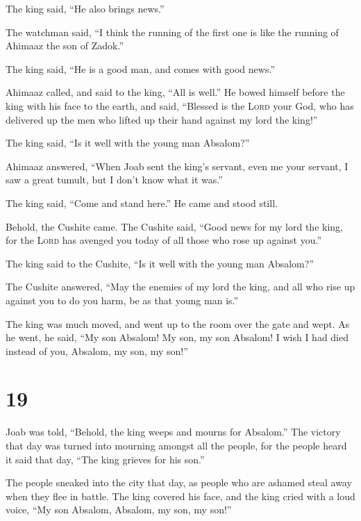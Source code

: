 The king said, ``He also brings news.''

 The watchman said, ``I think the running of the first
one is like the running of Ahimaaz the son of Zadok.''

The king said, ``He is a good man, and comes with good news.''

 Ahimaaz called, and said to the king, ``All is well.''
He bowed himself before the king with his face to the earth, and said,
``Blessed is the \textsc{Lord} your God, who has delivered up the men
who lifted up their hand against my lord the king!''

 The king said, ``Is it well with the young man
Absalom?''

Ahimaaz answered, ``When Joab sent the king's servant, even me your
servant, I saw a great tumult, but I don't know what it was.''

 The king said, ``Come and stand here.'' He came and
stood still.

 Behold, the Cushite came. The Cushite said, ``Good news
for my lord the king, for the \textsc{Lord} has avenged you today of all
those who rose up against you.''

 The king said to the Cushite, ``Is it well with the
young man Absalom?''

The Cushite answered, ``May the enemies of my lord the king, and all who
rise up against you to do you harm, be as that young man is.''

 The king was much moved, and went up to the room over
the gate and wept. As he went, he said, ``My son Absalom! My son, my son
Absalom! I wish I had died instead of you, Absalom, my son, my son!''

\hypertarget{section-18}{%
\section{19}\label{section-18}}

 Joab was told, ``Behold, the king weeps and mourns for
Absalom.''  The victory that day was turned into mourning
amongst all the people, for the people heard it said that day, ``The
king grieves for his son.''

 The people sneaked into the city that day, as people who
are ashamed steal away when they flee in battle.  The king
covered his face, and the king cried with a loud voice, ``My son
Absalom, Absalom, my son, my son!''

